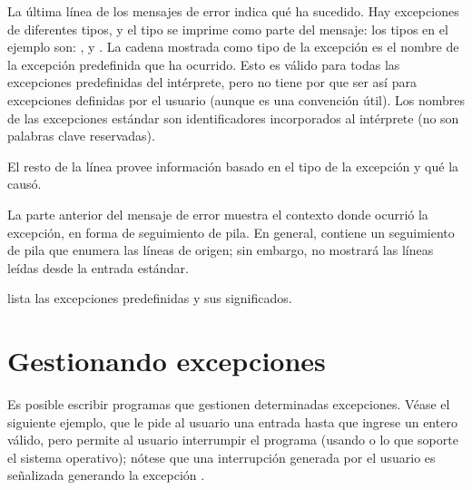 \documentclass[a4,10pt,spanish]{sphinxmanual}
\begin{document}
\sphinxAtStartPar
La última línea de los mensajes de error indica qué ha sucedido.  Hay excepciones de diferentes tipos, y el tipo se imprime como parte del mensaje: los tipos en el ejemplo son: ,  y .  La cadena mostrada como tipo de la excepción es el nombre de la excepción predefinida que ha ocurrido.  Esto es válido para todas las excepciones predefinidas del intérprete, pero no tiene por que ser así para excepciones definidas por el usuario (aunque es una convención útil).  Los nombres de las excepciones estándar son identificadores incorporados al intérprete (no son palabras clave reservadas).

\sphinxAtStartPar
El resto de la línea provee información basado en el tipo de la excepción y qué la causó.

\sphinxAtStartPar
La parte anterior del mensaje de error muestra el contexto donde ocurrió la excepción, en forma de seguimiento de pila. En general, contiene un seguimiento de pila que enumera las líneas de origen; sin embargo, no mostrará las líneas leídas desde la entrada estándar.

\sphinxAtStartPar
{} lista las excepciones predefinidas y sus significados.


\section{Gestionando excepciones}
\label{\detokenize{tutorial/errors:handling-exceptions}}\label{\detokenize{tutorial/errors:tut-handling}}
\sphinxAtStartPar
Es posible escribir programas que gestionen determinadas excepciones.  Véase el siguiente ejemplo, que le pide al usuario una entrada hasta que ingrese un entero válido, pero permite al usuario interrumpir el programa (usando  o lo que soporte el sistema operativo); nótese que una interrupción generada por el usuario es señalizada generando la excepción .

\begin{sphinxVerbatim}[commandchars=\\\{\}]
 
    
          
        
     
        
\end{sphinxVerbatim}
\end{document}
